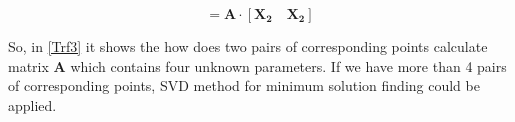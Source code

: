 \begin{equation}[\mathbf{x_1} \quad \mathbf{x_2}]=
\mathbf{A}\cdot [\mathbf{X_2} \quad \mathbf{X_2}]
\label{Trf3}
\end{equation}

So, in \eqref{Trf3} it shows the how does two pairs of corresponding points calculate matrix $\mathbf{A}$ which contains four unknown parameters. If we have more than 4 pairs of corresponding points, SVD method for minimum solution finding could be applied.





